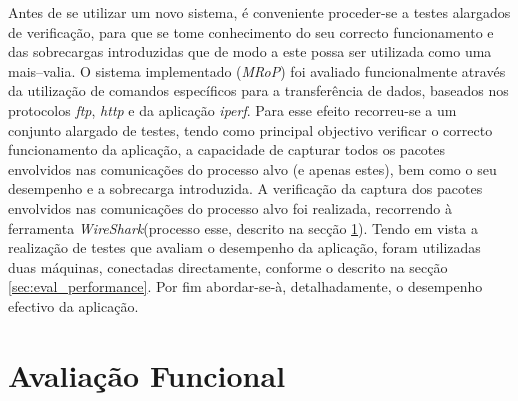 








Antes de se utilizar um novo sistema, é conveniente proceder-se a testes alargados de verificação, para que se tome conhecimento do seu correcto funcionamento e das sobrecargas introduzidas que de modo a este possa ser utilizada como uma mais–valia. 
O sistema implementado (\textit{MRoP}) foi avaliado funcionalmente através da utilização de comandos específicos para a transferência de dados, baseados nos protocolos \textit{ftp}, \textit{http} e da aplicação \textit{iperf}.
Para esse efeito recorreu-se a um conjunto alargado de testes, tendo como principal objectivo verificar o correcto funcionamento da aplicação, a capacidade de capturar todos os pacotes envolvidos nas comunicações do processo alvo (e apenas estes), bem como o seu desempenho e a sobrecarga introduzida.
A verificação da captura dos pacotes envolvidos nas comunicações do processo alvo foi realizada, recorrendo à ferramenta \textit{WireShark}(processo esse, descrito na secção \ref{sec:eval_functional}).
Tendo em vista a realização de testes que avaliam o desempenho da aplicação, foram utilizadas duas máquinas, conectadas directamente, conforme o descrito  na secção \ref{sec:eval_performance}.
Por fim abordar-se-à, detalhadamente, o desempenho efectivo da aplicação.


\section{Avaliação Funcional}
\label{sec:eval_functional}


